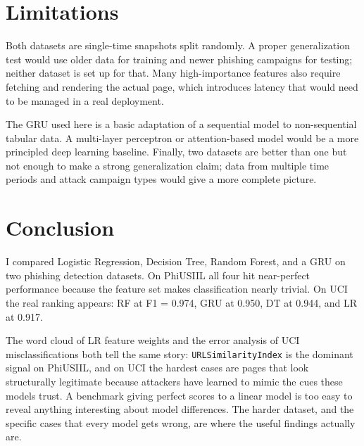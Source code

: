 \documentclass{article}
\begin{document}
\section{Limitations}
\label{sec:limitations}

Both datasets are single-time snapshots split randomly.
A proper generalization test would use older data for training and newer phishing campaigns for testing; neither dataset is set up for that.
Many high-importance features also require fetching and rendering the actual page, which introduces latency that would need to be managed in a real deployment.

The GRU used here is a basic adaptation of a sequential model to non-sequential tabular data.
A multi-layer perceptron or attention-based model would be a more principled deep learning baseline.
Finally, two datasets are better than one but not enough to make a strong generalization claim; data from multiple time periods and attack campaign types would give a more complete picture.

\section{Conclusion}
\label{sec:conclusion}

I compared Logistic Regression, Decision Tree, Random Forest, and a GRU on two phishing detection datasets.
On PhiUSIIL all four hit near-perfect performance because the feature set makes classification nearly trivial.
On UCI the real ranking appears: RF at F1 = 0.974, GRU at 0.950, DT at 0.944, and LR at 0.917.

The word cloud of LR feature weights and the error analysis of UCI misclassifications both tell the same story: \texttt{URLSimilarityIndex} is the dominant signal on PhiUSIIL, and on UCI the hardest cases are pages that look structurally legitimate because attackers have learned to mimic the cues these models trust.
A benchmark giving perfect scores to a linear model is too easy to reveal anything interesting about model differences.
The harder dataset, and the specific cases that every model gets wrong, are where the useful findings actually are.
\end{document}
